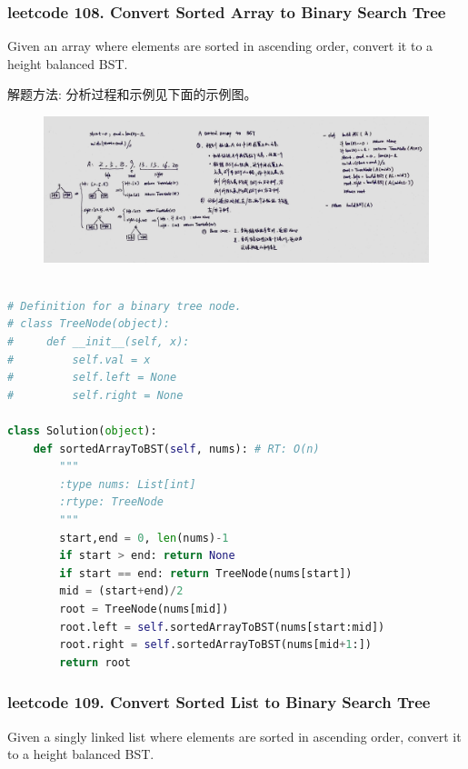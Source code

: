 \documentclass[a4paper,10pt]{article}
\begin{document}
\subsubsection{leetcode 108. Convert Sorted Array to Binary Search Tree}
Given an array where elements are sorted in ascending order, convert it to a height balanced BST. \\

\begin{CJK*}{UTF8}{gbsn}
\noindent 解题方法: 分析过程和示例见下面的示例图。\\
\end{CJK*}

\begin{figure}[h]
    \includegraphics[width=1\textwidth]{leetcode108.jpg}
    \centering\\
\end{figure}

\begin{lstlisting}[language=Python, caption=Problem108. Convert Sorted Array to Binary Search Tree]

# Definition for a binary tree node.
# class TreeNode(object):
#     def __init__(self, x):
#         self.val = x
#         self.left = None
#         self.right = None

class Solution(object):
    def sortedArrayToBST(self, nums): # RT: O(n)
        """
        :type nums: List[int]
        :rtype: TreeNode
        """
        start,end = 0, len(nums)-1
        if start > end: return None
        if start == end: return TreeNode(nums[start])
        mid = (start+end)/2
        root = TreeNode(nums[mid])
        root.left = self.sortedArrayToBST(nums[start:mid])
        root.right = self.sortedArrayToBST(nums[mid+1:])
        return root
\end{lstlisting}


\subsubsection{leetcode 109. Convert Sorted List to Binary Search Tree}
Given a singly linked list where elements are sorted in ascending order, convert it to a height balanced BST. \\
\end{document}
